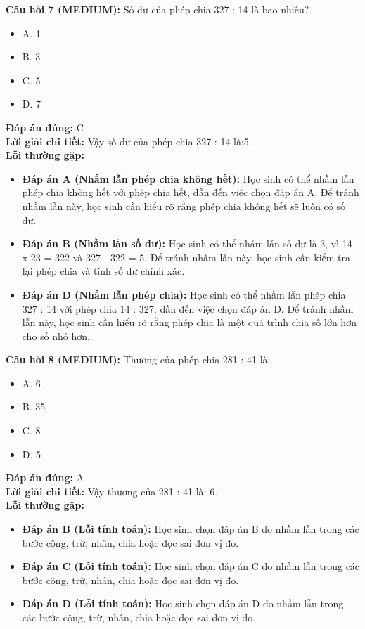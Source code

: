\documentclass{article}
\begin{document}
\begin{minipage}{\textwidth}
\noindent\textbf{Câu hỏi 7 (MEDIUM):} Số dư của phép chia 327 : 14 là bao nhiêu? 
\begin{itemize}[label={}]
    \item A. 1
    \item B. 3
    \item C. 5
    \item D. 7
\end{itemize}
\textbf{Đáp án đúng:} C \\
\textbf{Lời giải chi tiết:} Vậy số dư của phép chia 327 : 14 là:5. \\
\textbf{Lỗi thường gặp:}
\begin{itemize}
  \item \textbf{Đáp án A (Nhầm lẫn phép chia không hết):} Học sinh có thể nhầm lẫn phép chia không hết với phép chia hết, dẫn đến việc chọn đáp án A. Để tránh nhầm lẫn này, học sinh cần hiểu rõ rằng phép chia không hết sẽ luôn có số dư.
  \item \textbf{Đáp án B (Nhầm lẫn số dư):} Học sinh có thể nhầm lẫn số dư là 3, vì 14 x 23 = 322 và 327 - 322 = 5. Để tránh nhầm lẫn này, học sinh cần kiểm tra lại phép chia và tính số dư chính xác.
  \item \textbf{Đáp án D (Nhầm lẫn phép chia):} Học sinh có thể nhầm lẫn phép chia 327 : 14 với phép chia 14 : 327, dẫn đến việc chọn đáp án D. Để tránh nhầm lẫn này, học sinh cần hiểu rõ rằng phép chia là một quá trình chia số lớn hơn cho số nhỏ hơn.
\end{itemize}
\end{minipage}
\vspace{1em}

\begin{minipage}{\textwidth}
\noindent\textbf{Câu hỏi 8 (MEDIUM):} Thương của phép chia 281 : 41 là: 
\begin{itemize}[label={}]
    \item A. 6
    \item B. 35
    \item C. 8
    \item D. 5
\end{itemize}
\textbf{Đáp án đúng:} A \\
\textbf{Lời giải chi tiết:} Vậy thương của 281 : 41 là: 6. \\
\textbf{Lỗi thường gặp:}
\begin{itemize}
  \item \textbf{Đáp án B (Lỗi tính toán):} Học sinh chọn đáp án B do nhầm lẫn trong các bước cộng, trừ, nhân, chia hoặc đọc sai đơn vị đo.
  \item \textbf{Đáp án C (Lỗi tính toán):} Học sinh chọn đáp án C do nhầm lẫn trong các bước cộng, trừ, nhân, chia hoặc đọc sai đơn vị đo.
  \item \textbf{Đáp án D (Lỗi tính toán):} Học sinh chọn đáp án D do nhầm lẫn trong các bước cộng, trừ, nhân, chia hoặc đọc sai đơn vị đo.
\end{itemize}
\end{minipage}
\vspace{1em}
\end{document}
